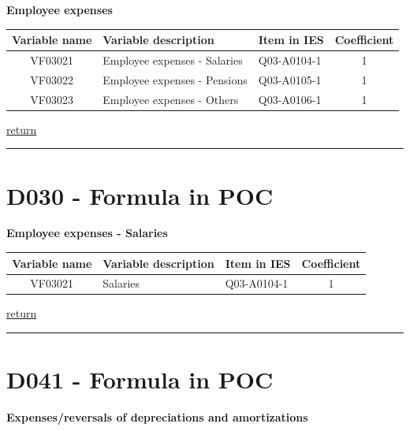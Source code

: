 \documentclass[]{book}
\begin{document}
\textbf{Employee expenses}

\begin{longtable}[]{@{}cllc@{}}
\toprule
Variable name & Variable description & Item in IES & Coefficient\tabularnewline
\midrule
\endhead
VF03021 & Employee expenses - Salaries & Q03-A0104-1 & 1\tabularnewline
VF03022 & Employee expenses - Pensions & Q03-A0105-1 & 1\tabularnewline
VF03023 & Employee expenses - Others & Q03-A0106-1 & 1\tabularnewline
\bottomrule
\end{longtable}

\protect\hyperlink{b3.-profit-and-loss-statement-variables}{return}

\begin{center}\rule{0.5\linewidth}{\linethickness}\end{center}

\hypertarget{d030---formula-in-poc}{%
\section{D030 - Formula in POC}\label{d030---formula-in-poc}}

\textbf{Employee expenses - Salaries}

\begin{longtable}[]{@{}cllc@{}}
\toprule
Variable name & Variable description & Item in IES & Coefficient\tabularnewline
\midrule
\endhead
VF03021 & Salaries & Q03-A0104-1 & 1\tabularnewline
\bottomrule
\end{longtable}

\protect\hyperlink{b3.-profit-and-loss-statement-variables}{return}

\begin{center}\rule{0.5\linewidth}{\linethickness}\end{center}

\hypertarget{d041---formula-in-poc}{%
\section{D041 - Formula in POC}\label{d041---formula-in-poc}}

\textbf{Expenses/reversals of depreciations and amortizations}
\end{document}
